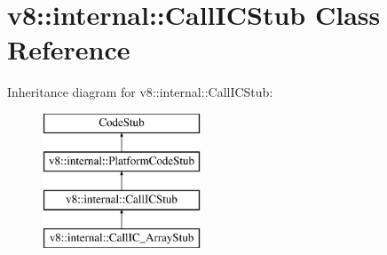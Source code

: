 \hypertarget{classv8_1_1internal_1_1_call_i_c_stub}{}\section{v8\+:\+:internal\+:\+:Call\+I\+C\+Stub Class Reference}
\label{classv8_1_1internal_1_1_call_i_c_stub}
Inheritance diagram for v8\+:\+:internal\+:\+:Call\+I\+C\+Stub\+:\begin{figure}[H]
\begin{center}
\leavevmode
\includegraphics[height=4.000000cm]{classv8_1_1internal_1_1_call_i_c_stub}
\end{center}
\end{figure}
